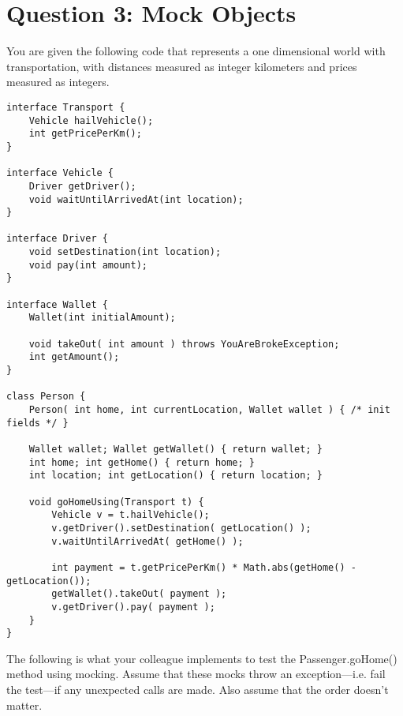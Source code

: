 \documentclass[12pt]{article}
\begin{document}


\section*{Question 3: Mock Objects}
You are given the following code that represents a one dimensional world with transportation, with distances measured as integer kilometers and prices measured as integers.

\begin{lstlisting}
interface Transport {
    Vehicle hailVehicle();
    int getPricePerKm();
}

interface Vehicle {
    Driver getDriver();
    void waitUntilArrivedAt(int location);
}

interface Driver {
    void setDestination(int location);
    void pay(int amount);
}

interface Wallet {
    Wallet(int initialAmount);

    void takeOut( int amount ) throws YouAreBrokeException;
    int getAmount();
}

class Person {
    Person( int home, int currentLocation, Wallet wallet ) { /* init fields */ }

    Wallet wallet; Wallet getWallet() { return wallet; }
    int home; int getHome() { return home; }
    int location; int getLocation() { return location; }

    void goHomeUsing(Transport t) {
        Vehicle v = t.hailVehicle();
        v.getDriver().setDestination( getLocation() );
        v.waitUntilArrivedAt( getHome() );

        int payment = t.getPricePerKm() * Math.abs(getHome() - getLocation());
        getWallet().takeOut( payment );
        v.getDriver().pay( payment );
    }
}
\end{lstlisting}

The following is what your colleague implements to test the Passenger.goHome() method using mocking. Assume that these mocks throw an exception---i.e. fail the test---if any unexpected calls are made. Also assume that the order doesn't matter.
\end{document}

